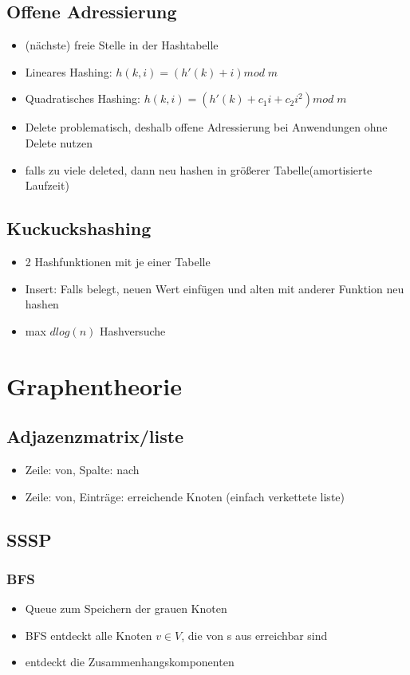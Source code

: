 \documentclass{article}
\begin{document}
\subsection{Offene Adressierung}
\begin{itemize}
\item (n{\"a}chste) freie Stelle in der Hashtabelle
\item Lineares Hashing: $h(k,i) = (h'(k) +i) mod \; m$
\item Quadratisches Hashing: $h(k,i) = (h'(k) +c_1i+ c_2 i^2) mod \; m$
\item Delete problematisch, deshalb offene Adressierung bei Anwendungen ohne Delete nutzen
\item falls zu viele deleted, dann neu hashen in gr{\"o}\ss erer Tabelle(amortisierte Laufzeit)
\end{itemize}

\subsection{Kuckuckshashing}
\begin{itemize}
\item 2 Hashfunktionen mit je einer Tabelle
\item Insert: Falls belegt, neuen Wert einf{\"u}gen und alten mit anderer Funktion neu hashen
\item max $d log(n)$ Hashversuche
\end{itemize}


\section{Graphentheorie}
\subsection{Adjazenzmatrix/liste}
\begin{itemize}
\item Zeile: von, Spalte: nach
\item Zeile: von, Eintr{\"a}ge: erreichende Knoten (einfach verkettete liste)
\end{itemize}

\subsection{SSSP}
\subsubsection{BFS}
\begin{itemize}
\item Queue zum Speichern der grauen Knoten
\item BFS entdeckt alle Knoten $v\in V$, die von s aus erreichbar sind
\item entdeckt die Zusammenhangskomponenten
\end{itemize}
\end{document}
